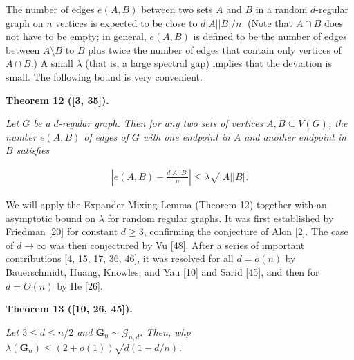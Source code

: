 \documentclass[10pt,a4paper]{article}
\begin{document}
The number of edges $e(A,B)$ between two sets $A$ and $B$ in a random $d$-regular graph on $n$ vertices is expected to be close to $d|A||B|/n$. (Note that $A\cap B$ does not have to be empty; in general, $e(A,B)$ is defined to be the number of edges between $A\setminus B$ to $B$ plus twice the number of edges that contain only vertices of $A\cap B$.) A small $\lambda$ (that is, a large spectral gap) implies that the deviation is small. The following bound is very convenient.\par





\par\medskip\noindent\textbf{
\textbf{Theorem 12}\textbf{ }([3, 35])\textbf{.}
}\par



\emph{Let $G$ be a $d$-regular graph. Then for any two sets of vertices $A,B\subseteq V(G)$, the number $e(A,B)$ of edges of $G$ with one endpoint in $A$ and another endpoint in $B$ satisfies}\par


\[\begin{gathered}
\left|e(A,B)-\frac{d|A||B|}{n}\right|\leq\lambda\sqrt{|A||B|}.
\end{gathered}\]






We will apply the Expander Mixing Lemma (Theorem 12) together with an asymptotic bound on $\lambda$ for random regular graphs. It was first established by Friedman [20] for constant $d\geq 3$, confirming the conjecture of Alon [2]. The case of $d\to\infty$ was then conjectured by Vu [48]. After a series of important contributions [4, 15, 17, 36, 46], it was resolved for all $d=o(n)$ by Bauerschmidt, Huang, Knowles, and Yau [10] and Sarid [45], and then for $d=\Theta(n)$ by He [26].\par





\par\medskip\noindent\textbf{
\textbf{Theorem 13}\textbf{ }([10, 26, 45])\textbf{.}
}\par



\emph{Let $3\leq d\leq n/2$ and $\mathbf{G}_{n}\sim\mathcal{G}_{n,d}$. Then, whp $\lambda(\mathbf{G}_{n})\leq(2+o(1))\sqrt{d(1-d/n)}$.}\par
\end{document}
